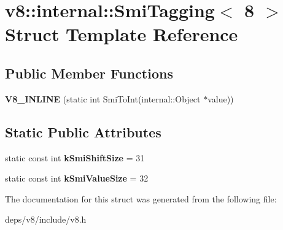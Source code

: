 \hypertarget{structv8_1_1internal_1_1_smi_tagging_3_018_01_4}{}\section{v8\+:\+:internal\+:\+:Smi\+Tagging$<$ 8 $>$ Struct Template Reference}
\label{structv8_1_1internal_1_1_smi_tagging_3_018_01_4}
\subsection*{Public Member Functions}
\begin{DoxyCompactItemize}
\item 
\hypertarget{structv8_1_1internal_1_1_smi_tagging_3_018_01_4_a437400284d4bceba15aebeaa2fb81c70}{}{\bfseries V8\+\_\+\+I\+N\+L\+I\+N\+E} (static int Smi\+To\+Int(internal\+::\+Object $\ast$value))\label{structv8_1_1internal_1_1_smi_tagging_3_018_01_4_a437400284d4bceba15aebeaa2fb81c70}

\end{DoxyCompactItemize}
\subsection*{Static Public Attributes}
\begin{DoxyCompactItemize}
\item 
\hypertarget{structv8_1_1internal_1_1_smi_tagging_3_018_01_4_a9a3b3da7b6d82417b961c8bed4366407}{}static const int {\bfseries k\+Smi\+Shift\+Size} = 31\label{structv8_1_1internal_1_1_smi_tagging_3_018_01_4_a9a3b3da7b6d82417b961c8bed4366407}

\item 
\hypertarget{structv8_1_1internal_1_1_smi_tagging_3_018_01_4_a08ad86fa77f6faee6ec744abdb0f6dce}{}static const int {\bfseries k\+Smi\+Value\+Size} = 32\label{structv8_1_1internal_1_1_smi_tagging_3_018_01_4_a08ad86fa77f6faee6ec744abdb0f6dce}

\end{DoxyCompactItemize}


The documentation for this struct was generated from the following file\+:\begin{DoxyCompactItemize}
\item 
deps/v8/include/v8.\+h\end{DoxyCompactItemize}
